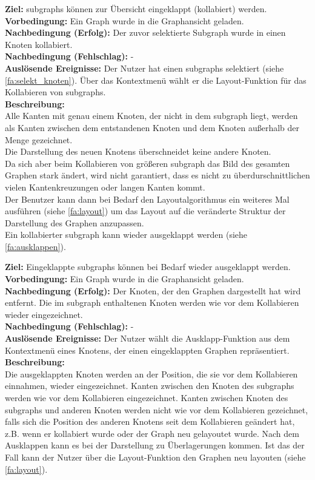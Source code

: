 \label{fa:kollabieren}
\textbf{Ziel:} \glspl{subgraph} können zur Übersicht eingeklappt (kollabiert) werden.\\
\textbf{Vorbedingung:} Ein Graph wurde in die Graphansicht geladen.\\
\textbf{Nachbedingung (Erfolg):} Der zuvor selektierte Subgraph wurde in einen Knoten kollabiert.\\
\textbf{Nachbedingung (Fehlschlag):} -\\
\textbf{Auslösende Ereignisse:} Der Nutzer hat einen \glspl{subgraph} selektiert (siehe \ref{fa:selekt_knoten}).
Über das Kontextmenü wählt er die Layout-Funktion für das Kollabieren von \glspl{subgraph}.\\
\textbf{Beschreibung:}\\
Alle Kanten mit genau einem Knoten, der nicht in dem \gls{subgraph} liegt, werden als Kanten zwischen dem entstandenen Knoten und dem Knoten außerhalb der Menge gezeichnet.\\
Die Darstellung des neuen Knotens überschneidet keine andere Knoten.\\
Da sich aber beim Kollabieren von größeren \gls{subgraph} das Bild des gesamten Graphen stark ändert, wird nicht garantiert,
dass es nicht zu überdurschnittlichen vielen Kantenkreuzungen oder langen Kanten kommt.\\
Der Benutzer kann dann bei Bedarf den Layoutalgorithmus ein weiteres Mal ausführen (siehe \ref{fa:layout}) um das Layout auf die
veränderte Struktur der Darstellung des Graphen anzupassen.\\
Ein kollabierter \gls{subgraph} kann wieder ausgeklappt werden (siehe \ref{fa:ausklappen}).


\label{fa:ausklappen}
\textbf{Ziel:} Eingeklappte \glspl{subgraph} können bei Bedarf wieder ausgeklappt werden.\\
\textbf{Vorbedingung:} Ein Graph wurde in die Graphansicht geladen.\\
\textbf{Nachbedingung (Erfolg):} Der Knoten, der den Graphen dargestellt hat wird entfernt. Die im \gls{subgraph} enthaltenen Knoten werden wie vor dem Kollabieren wieder eingezeichnet.\\
\textbf{Nachbedingung (Fehlschlag):} -\\
\textbf{Auslösende Ereignisse:} Der Nutzer wählt die Ausklapp-Funktion aus dem Kontextmenü eines Knotens, der einen eingeklappten Graphen repräsentiert.\\
\textbf{Beschreibung:}\\
Die ausgeklappten Knoten werden an der Position, die sie vor dem Kollabieren einnahmen,  wieder eingezeichnet.
Kanten zwischen den Knoten des \glspl{subgraph} werden wie vor dem Kollabieren eingezeichnet.
Kanten zwischen Knoten des \glspl{subgraph} und anderen Knoten werden nicht wie vor dem Kollabieren gezeichnet,
falls sich die Position des anderen Knotens seit dem Kollabieren geändert hat, z.B. wenn er kollabiert wurde oder der Graph neu gelayoutet wurde.
Nach dem Ausklappen kann es bei der Darstellung zu Überlagerungen kommen.
Ist das der Fall kann der Nutzer über die Layout-Funktion den Graphen neu layouten (siehe \ref{fa:layout}).

